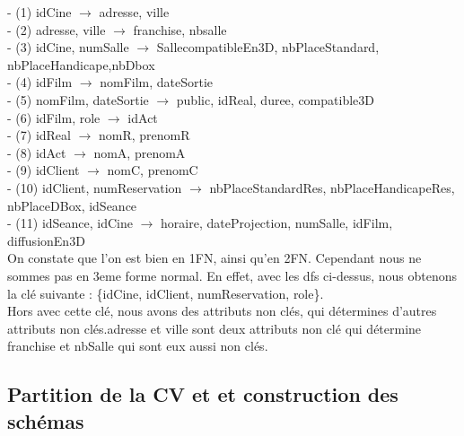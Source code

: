 \documentclass[a4paper,sffamily,12pt]{article}
\begin{document}
						\noindent- (1) idCine $\rightarrow$ adresse, ville \\
						- (2) adresse, ville $\rightarrow$ franchise, nbsalle \\
						- (3) idCine, numSalle $\rightarrow$ SallecompatibleEn3D, nbPlaceStandard, nbPlaceHandicape,nbDbox \\
				 		- (4) idFilm $\rightarrow$ nomFilm, dateSortie \\
						- (5) nomFilm, dateSortie $\rightarrow$ public, idReal, duree, compatible3D \\
						- (6) idFilm, role $\rightarrow$  idAct \\
						- (7) idReal $\rightarrow$ nomR, prenomR \\
						- (8) idAct $\rightarrow$ nomA, prenomA \\
						- (9) idClient $\rightarrow$ nomC, prenomC \\
						- (10) idClient, numReservation $\rightarrow$ nbPlaceStandardRes, nbPlaceHandicapeRes, nbPlaceDBox, idSeance \\
						- (11) idSeance, idCine $\rightarrow$ horaire, dateProjection, numSalle, idFilm, diffusionEn3D \\
															
						On constate que l'on est bien en 1FN, ainsi qu'en 2FN. Cependant nous ne sommes pas en 3eme forme normal. En effet, avec les dfs ci-dessus, nous obtenons la clé suivante : \{idCine, idClient, numReservation, role\}. \\
						Hors avec cette clé, nous avons des attributs non clés, qui détermines d'autres attributs non clés.adresse et ville sont deux attributs non clé qui détermine franchise et nbSalle qui sont eux aussi non clés. \\
															
					\subsection{Partition de la CV et et construction des schémas} 	
					
\end{document}
